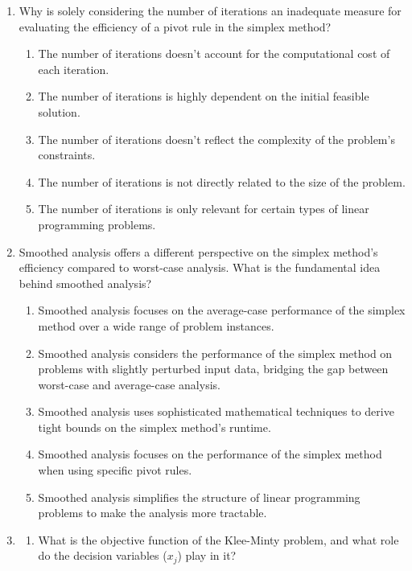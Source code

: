\documentclass{article}%
\begin{document}
\begin{enumerate}
\begin{enumerate}
\end{enumerate}%
\vspace{1em}%
\item Why is solely considering the number of iterations an inadequate measure for evaluating the efficiency of a pivot rule in the simplex method?%
\begin{enumerate}%
\item The number of iterations doesn't account for the computational cost of each iteration.%
\item The number of iterations is highly dependent on the initial feasible solution.%
\item The number of iterations doesn't reflect the complexity of the problem's constraints.%
\item The number of iterations is not directly related to the size of the problem.%
\item The number of iterations is only relevant for certain types of linear programming problems.%
\end{enumerate}%
\vspace{1em}%
\item Smoothed analysis offers a different perspective on the simplex method's efficiency compared to worst-case analysis. What is the fundamental idea behind smoothed analysis?%
\begin{enumerate}%
\item Smoothed analysis focuses on the average-case performance of the simplex method over a wide range of problem instances.%
\item Smoothed analysis considers the performance of the simplex method on problems with slightly perturbed input data, bridging the gap between worst-case and average-case analysis.%
\item Smoothed analysis uses sophisticated mathematical techniques to derive tight bounds on the simplex method's runtime.%
\item Smoothed analysis focuses on the performance of the simplex method when using specific pivot rules.%
\item Smoothed analysis simplifies the structure of linear programming problems to make the analysis more tractable.%
\end{enumerate}%
\vspace{1em}%
\item%
\begin{enumerate}%
\item What is the objective function of the Klee-Minty problem, and what role do the decision variables ($x_j$) play in it?%

\end{enumerate}
\end{enumerate}
\end{document}
